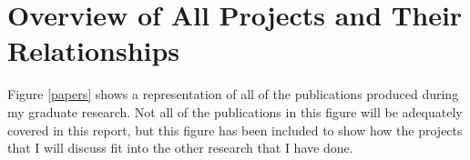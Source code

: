 

\section{Overview of All Projects and Their Relationships}

Figure \ref{papers} shows a representation of all of the publications produced during my graduate research. Not all of the publications in this figure will be adequately covered in this report, but this figure has been included to show how the projects that I will discuss fit into the other research that I have done. 

